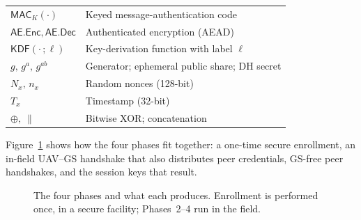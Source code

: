 \documentclass[11pt,a4paper]{article}
\begin{document}
\begin{table}[H]
\begin{tabular}{@{}ll@{}}
$\mathsf{MAC}_K(\cdot)$ & Keyed message-authentication code \\
$\mathsf{AE}.\mathsf{Enc},\mathsf{AE}.\mathsf{Dec}$ & Authenticated encryption (AEAD) \\
$\mathsf{KDF}(\cdot\,;\ell)$ & Key-derivation function with label $\ell$ \\
$g,\,g^{a},\,g^{ab}$ & Generator; ephemeral public share; DH secret \\
$N_x,\,n_x$ & Random nonces (128-bit) \\
$T_x$ & Timestamp (32-bit) \\
$\oplus,\ \|$ & Bitwise XOR; concatenation \\
\bottomrule
\end{tabular}
\end{table}

Figure~\ref{fig:overview} shows how the four phases fit together: a one-time
secure enrollment, an in-field UAV--GS handshake that also distributes peer
credentials, GS-free peer handshakes, and the session keys that result.

\begin{figure}[H]
\centering
{}
\caption{The four phases and what each produces. Enrollment is performed once,
in a secure facility; Phases~2--4 run in the field.}
\label{fig:overview}
\end{figure}
\end{document}
